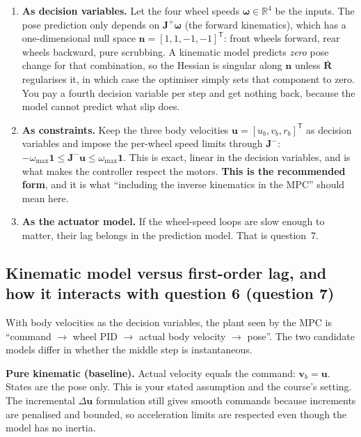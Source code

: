 \documentclass[11pt,a4paper]{article}
\newcommand{\vect}[1]{\bm{#1}}
\newcommand{\mat}[1]{\bm{#1}}
\newcommand{\T}{^{\mathsf{T}}}
\newcommand{\Real}{\mathbb{R}}
\newcommand{\du}{\Delta\vect{u}}
\newcommand{\Rbar}{\bar{\mat{R}}}
\newcommand{\ones}{\vect{1}}
\begin{document}
\begin{enumerate}[nosep]
  \item \textbf{As decision variables.} Let the four wheel speeds $\vect\omega\in\Real^4$ be the inputs. The pose prediction only depends on $\mat J^{+}\vect\omega$ (the forward kinematics), which has a one-dimensional null space $\vect n=[1,1,-1,-1]\T$: front wheels forward, rear wheels backward, pure scrubbing. A kinematic model predicts \emph{zero} pose change for that combination, so the Hessian is singular along $\vect n$ unless $\Rbar$ regularises it, in which case the optimiser simply sets that component to zero. You pay a fourth decision variable per step and get nothing back, because the model cannot predict what slip does.
  \item \textbf{As constraints.} Keep the three body velocities $\vect u=[u_b,v_b,r_b]\T$ as decision variables and impose the per-wheel speed limits through $\mat J^{-}$: $-\omega_{\max}\ones \le \mat J^{-}\vect u \le \omega_{\max}\ones$. This is exact, linear in the decision variables, and is what makes the controller respect the motors. \textbf{This is the recommended form}, and it is what ``including the inverse kinematics in the MPC'' should mean here.
  \item \textbf{As the actuator model.} If the wheel-speed loops are slow enough to matter, their lag belongs in the prediction model. That is question~7.
\end{enumerate}

\subsection{Kinematic model versus first-order lag, and how it interacts with question 6 (question 7)}
\label{sec:lag}

With body velocities as the decision variables, the plant seen by the MPC is ``command $\to$ wheel PID $\to$ actual body velocity $\to$ pose''. The two candidate models differ in whether the middle step is instantaneous.

\textbf{Pure kinematic (baseline).} Actual velocity equals the command: $\vect v_b = \vect u$. States are the pose only. This is your stated assumption and the course's setting. The incremental $\du$ formulation still gives smooth commands because increments are penalised and bounded, so acceleration limits are respected even though the model has no inertia.
\end{document}
